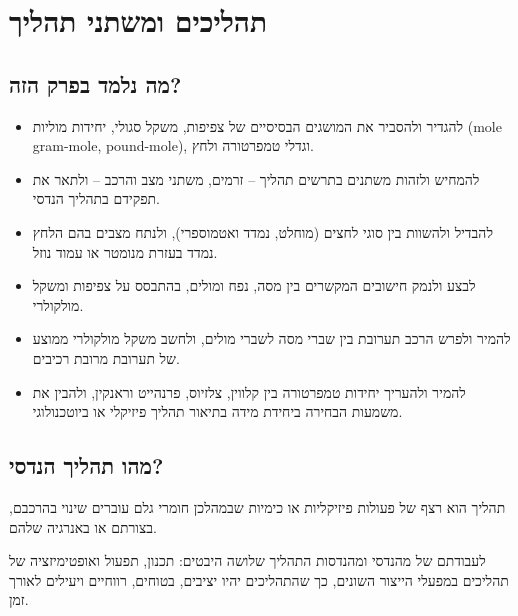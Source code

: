 \documentclass[
  hebrew,
  letterpaper,
  DIV=11,
  numbers=noendperiod]{scrreprt}
\begin{document}

\chapter{\texorpdfstring{{תהליכים ומשתני
תהליך}}{תהליכים ומשתני תהליך}}\label{ux5eaux5d4ux5dcux5d9ux5dbux5d9ux5dd-ux5d5ux5deux5e9ux5eaux5e0ux5d9-ux5eaux5d4ux5dcux5d9ux5da}

\section{\texorpdfstring{{מה נלמד בפרק
הזה}?}{מה נלמד בפרק הזה?}}\label{ux5deux5d4-ux5e0ux5dcux5deux5d3-ux5d1ux5e4ux5e8ux5e7-ux5d4ux5d6ux5d4-1}

\begin{itemize}
\item
  {{להגדיר ולהסביר} את המושגים הבסיסיים של צפיפות, משקל סגולי, יחידות
  מוליות} {(}mole gram-mole, pound-mole{), וגדלי טמפרטורה ולחץ}.
\item
  {{להמחיש ולזהות} משתנים בתרשים תהליך -- זרמים, משתני מצב והרכב --
  ולתאר את תפקידם בתהליך הנדסי}.
\item
  {{להבדיל ולהשוות} בין סוגי לחצים (מוחלט, נמדד ואטמוספרי), ולנתח מצבים
  בהם הלחץ נמדד בעזרת מנומטר או עמוד נוזל}.
\item
  {{לבצע ולנמק} חישובים המקשרים בין מסה, נפח ומולים, בהתבסס על צפיפות
  ומשקל מולקולרי}.
\item
  {{להמיר ולפרש} הרכב תערובת בין שברי מסה לשברי מולים, ולחשב משקל
  מולקולרי ממוצע של תערובת מרובת רכיבים}.
\item
  {{להמיר ולהעריך} יחידות טמפרטורה בין קלווין, צלזיוס, פרנהייט וראנקין,
  ולהבין את משמעות הבחירה ביחידת מידה בתיאור תהליך פיזיקלי או
  ביוטכנולוגי}.
\end{itemize}

\section{\texorpdfstring{{מהו תהליך
הנדסי?}}{מהו תהליך הנדסי?}}\label{ux5deux5d4ux5d5-ux5eaux5d4ux5dcux5d9ux5da-ux5d4ux5e0ux5d3ux5e1ux5d9}

{תהליך הוא רצף של פעולות פיזיקליות או כימיות שבמהלכן חומרי גלם עוברים
שינוי} {בהרכבם, בצורתם או באנרגיה שלהם.}

{לעבודתם של מהנדסי ומהנדסות התהליך שלושה היבטים: תכנון, תפעול
ואופטימיזציה של תהליכים במפעלי הייצור השונים, כך שהתהליכים יהיו יציבים,
בטוחים, רווחיים ויעילים לאורך זמן.}
\end{document}
